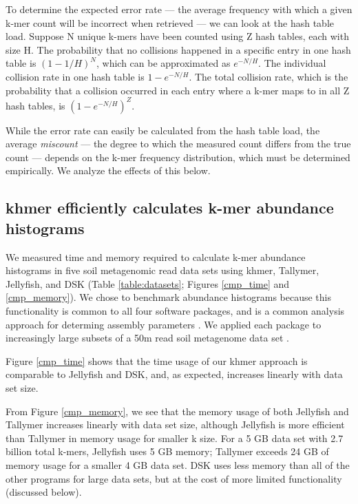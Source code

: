 \documentclass{article}
\begin{document}
To determine the expected error rate --- the average frequency
with which a given k-mer count will be incorrect when retrieved --- we
can look at the hash table load. Suppose N unique k-mers have been
counted using Z hash tables, each with size H.  The probability that
no collisions happened in a specific entry in one hash table is
$(1-1/H)^{N}$, which can be approximated as $e^{-N/H}$. The individual
collision rate in one hash table is $1-e^{-N/H}$. The total collision
rate, which is the probability that a collision occurred in each entry
where a k-mer maps to in all Z hash tables, is $(1-e^{-N/H})^{Z}$.

While the error rate can easily be calculated from the hash
table load, the average {\em miscount} --- the degree to which the measured count
differs from the true count --- depends on the k-mer frequency
distribution, which must be determined empirically.  We analyze the
effects of this below.

\subsection{khmer efficiently calculates k-mer abundance histograms}

We measured time and memory required to calculate k-mer abundance
histograms in five soil metagenomic read data sets using khmer,
Tallymer, Jellyfish, and DSK (Table \ref{table:datasets}; Figures \ref{cmp_time} and
\ref{cmp_memory}).  We chose to benchmark abundance histograms because
this functionality is common to all four software packages, and is a
common analysis approach for determing assembly parameters \cite{Chikhi2013}.
We applied each package to increasingly large subsets of a 50m read soil
metagenome data set \cite{Howe2012}.

Figure \ref{cmp_time} shows that the time usage of our khmer approach
is comparable to Jellyfish and DSK, and, as expected, increases linearly
with data set size.

From Figure \ref{cmp_memory}, we see that the memory usage of both
Jellyfish and Tallymer increases linearly with data set size, although
Jellyfish is more efficient than Tallymer in memory usage for smaller
k size. For a 5 GB data set with 2.7
billion total k-mers, Jellyfish uses 5 GB memory; Tallymer exceeds 24
GB of memory usage for a smaller 4 GB data set.  DSK uses less memory
than all of the other programs for large data sets, but at the cost
of more limited functionality (discussed below).
\end{document}
